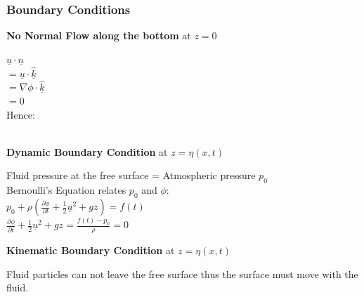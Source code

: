 \subsubsection{Boundary Conditions}
\textbf{No Normal Flow along the bottom} at $z=0$
\begin{center}
	$\underline{u} \cdot \underline{n}$
	\\
	$ = \underline{u} \cdot \hat{\underline{k}}$
	\\
	$= \nabla \phi \cdot \hat{\underline{k}} $
	\\
	$= 0$
	\\
	Hence:
	\\
	\\
\end{center}
\textbf{Dynamic Boundary Condition} at $z=\eta(x,t)$
\begin{center}
	Fluid pressure at the free surface = Atmospheric pressure $p_0$
	\\
	Bernoulli's Equation relates $p_0$ and $\phi$:
	\\
	$p_0 + \rho (\frac{\partial \phi}{\partial t} + \frac{1}{2} \underline{u}^2 + gz) = f(t)$
	\\
	$\frac{\partial \phi}{\partial t} + \frac{1}{2} \underline{u}^2 + gz = \frac{f(t) - p_0}{\rho} = 0$
	\\
\end{center}
\textbf{Kinematic Boundary Condition} at $z = \eta(x,t)$
\begin{center}
	Fluid particles can not leave the free surface thus the surface must move with the fluid.
	\\
	
\end{center}